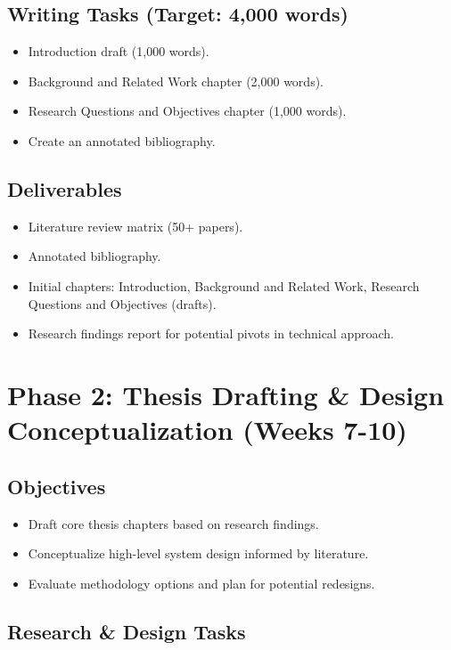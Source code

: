 \documentclass[12pt,a4paper]{article}
\begin{document}
\subsection*{Writing Tasks (Target: 4,000 words)}

\begin{itemize}
    \item Introduction draft (1,000 words).
    \item Background and Related Work chapter (2,000 words).
    \item Research Questions and Objectives chapter (1,000 words).
    \item Create an annotated bibliography.
\end{itemize}

\subsection*{Deliverables}

\begin{itemize}
    \item Literature review matrix (50+ papers).
    \item Annotated bibliography.
    \item Initial chapters: Introduction, Background and Related Work, Research Questions and Objectives (drafts).
    \item Research findings report for potential pivots in technical approach.
\end{itemize}

\section{Phase 2: Thesis Drafting \& Design Conceptualization (Weeks 7-10)}

\subsection*{Objectives}

\begin{itemize}
    \item Draft core thesis chapters based on research findings.
    \item Conceptualize high-level system design informed by literature.
    \item Evaluate methodology options and plan for potential redesigns.
\end{itemize}

\subsection*{Research \& Design Tasks}
\end{document}
